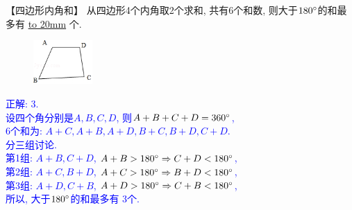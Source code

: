 \item {
    【四边形内角和】
    从四边形4个内角取2个求和, 共有6个和数, 则大于$180\degree$的和最多有 \underline{\hbox to 20mm{}} 个.
    \begin{figure}[H] 
        \centering
        \includegraphics[width=0.2\textwidth]{./pics/Chapter_2/11.png}
    \end{figure}
    \ifshowSolution 
        \fangsong{}\textcolor{blue}{
            正解: 3.\\
            设四个角分别是$A,B,C,D$, 则$A+B+C+D = 360\degree$, \\
            6个和为: $A+C, A+B, A+D, B+C, B+D, C+D$. \\
            分三组讨论.\\
            第1组: $A+B, C+D$, $A+B > 180\degree \Rightarrow C+D < 180\degree$, \\
            第2组: $A+C,B+D$, $A+C > 180\degree \Rightarrow B+D < 180\degree$, \\
            第3组: $A+D,C+B$, $A+D > 180\degree \Rightarrow C+B < 180\degree$, \\
            所以, 大于$180\degree$的和最多有 3个.
        }
    \else
        \vspace{1cm}
    \fi
}
